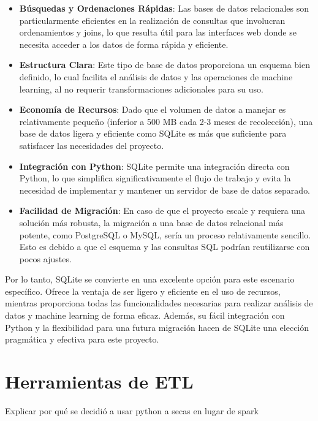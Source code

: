 \begin{itemize}
\item \textbf{Búsquedas y Ordenaciones Rápidas}: Las bases de datos relacionales son particularmente eficientes en la realización de consultas que involucran ordenamientos y joins, lo que resulta útil para las interfaces web donde se necesita acceder a los datos de forma rápida y eficiente.

\item \textbf{Estructura Clara}: Este tipo de base de datos proporciona un esquema bien definido, lo cual facilita el análisis de datos y las operaciones de machine learning, al no requerir transformaciones adicionales para su uso.

\item \textbf{Economía de Recursos}: Dado que el volumen de datos a manejar es relativamente pequeño (inferior a 500 MB cada 2-3 meses de recolección), una base de datos ligera y eficiente como SQLite es más que suficiente para satisfacer las necesidades del proyecto.

\item \textbf{Integración con Python}: SQLite permite una integración directa con Python, lo que simplifica significativamente el flujo de trabajo y evita la necesidad de implementar y mantener un servidor de base de datos separado.

\item \textbf{Facilidad de Migración}: En caso de que el proyecto escale y requiera una solución más robusta, la migración a una base de datos relacional más potente, como PostgreSQL o MySQL, sería un proceso relativamente sencillo. Esto es debido a que el esquema y las consultas SQL podrían reutilizarse con pocos ajustes.
\end{itemize}

Por lo tanto, SQLite se convierte en una excelente opción para este escenario específico. Ofrece la ventaja de ser ligero y eficiente en el uso de recursos, mientras proporciona todas las funcionalidades necesarias para realizar análisis de datos y machine learning de forma eficaz. Además, su fácil integración con Python y la flexibilidad para una futura migración hacen de SQLite una elección pragmática y efectiva para este proyecto.

\section{Herramientas de ETL}

Explicar por qué se decidió a usar python a secas en lugar de spark

